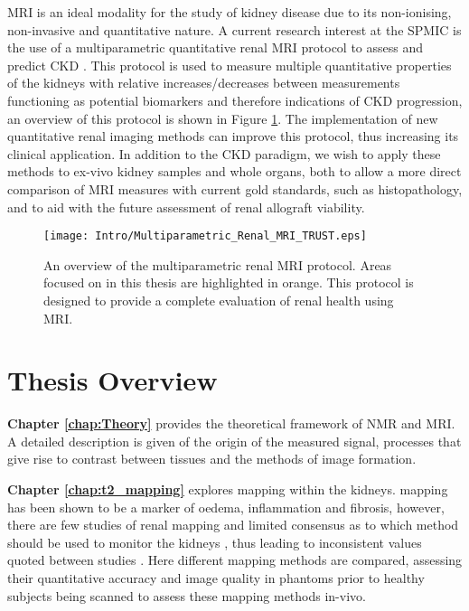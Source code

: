 \ac{MRI} is an ideal modality for the study of kidney disease due to its non-ionising, non-invasive and quantitative nature. A current research interest at the \ac{SPMIC} is the use of a multiparametric quantitative renal \ac{MRI} protocol to assess and predict \ac{CKD} \cite{cox_multiparametric_2017, buchanan_quantitative_2019}. This protocol is used to measure multiple quantitative properties of the kidneys with relative increases/decreases between measurements functioning as potential biomarkers and therefore indications of \ac{CKD} progression, an overview of this protocol is shown in Figure \ref{fig:intro_multi_para_overview}. The implementation of new quantitative renal imaging methods can improve this protocol, thus increasing its clinical application. In addition to the \ac{CKD} paradigm, we wish to apply these methods to ex-vivo kidney samples and whole organs, both to allow a more direct comparison of MRI measures with current gold standards, such as histopathology, and to aid with the future assessment of renal allograft viability.

\begin{figure}[H]
	\centering
	\texttt{[image: Intro/Multiparametric\_Renal\_MRI\_TRUST.eps]}
	\caption{An overview of the multiparametric renal \ac{MRI} protocol. Areas focused on in this thesis are highlighted in orange. This protocol is designed to provide a complete evaluation of renal health using \ac{MRI}.}
	\label{fig:intro_multi_para_overview}	
\end{figure}

\newpage

\section{Thesis Overview}
\label{sec:intro_overview}

\textbf{Chapter \ref{chap:Theory}} provides the theoretical framework of \ac{NMR} and \ac{MRI}. A detailed description is given of the origin of the measured signal, processes that give rise to contrast between tissues and the methods of image formation.

\textbf{Chapter \ref{chap:t2_mapping}} explores \ttwo mapping within the kidneys. \ttwo mapping has been shown to be a marker of oedema, inflammation and fibrosis, however, there are few studies of renal \ttwo mapping and limited consensus as to which method should be used to monitor the kidneys \cite{dekkers_consensus-based_2019}, thus leading to inconsistent values quoted between studies \cite{wolf_magnetic_2018}. Here different \ttwo mapping methods are compared, assessing their quantitative accuracy and image quality in phantoms prior to healthy subjects being scanned to assess these \ttwo mapping methods in-vivo.

